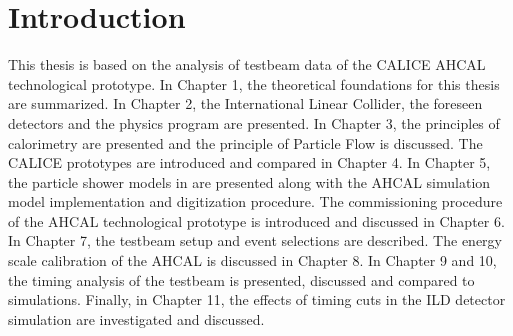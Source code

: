 \chapter{Introduction}

This thesis is based on the analysis of testbeam data of the CALICE AHCAL technological prototype. In Chapter 1, the theoretical foundations for this thesis are summarized. In Chapter 2, the International Linear Collider, the foreseen detectors and the physics program are presented. In Chapter 3, the principles of calorimetry are presented and the principle of Particle Flow is discussed. The CALICE prototypes are introduced and compared in Chapter 4. In Chapter 5, the particle shower models in  are presented along with the AHCAL simulation model implementation and digitization procedure. The commissioning procedure of the AHCAL technological prototype is introduced and discussed in Chapter 6. In Chapter 7, the testbeam setup and event selections are described. The energy scale calibration of the AHCAL is discussed in Chapter 8. In Chapter 9 and 10, the timing analysis of the testbeam is presented, discussed and compared to simulations. Finally, in Chapter 11, the effects of timing cuts in the ILD detector simulation are investigated and discussed.
